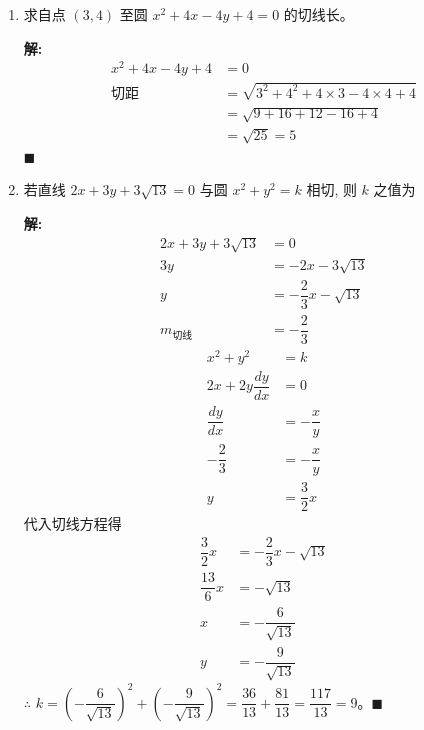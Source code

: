 \documentclass[10pt]{article}
\newcommand{\sol}{\textbf{解:} }
\begin{document}
\begin{enumerate}[leftmargin=*]
  \item 求自点 $(3,4)$ 至圆 $x^{2}+4 x-4 y+4=0$ 的切线长。

        \sol{}
        \begin{align*}
          x^{2}+4 x-4 y+4 & = 0                                              \\
          \text{切距}       & = \sqrt{3^2 + 4^2 + 4 \times 3 - 4 \times 4 + 4} \\
                          & = \sqrt{9 + 16 + 12 - 16 + 4}                    \\
                          & = \sqrt{25} = 5
        \end{align*} \hfill$\blacksquare$

  \item 若直线 $2 x+3 y+3 \sqrt{13}=0$ 与圆 $x^{2}+y^{2}=k$ 相切, 则 $k$ 之值为

        \sol{}
        \begin{align*}
          2x + 3y + 3\sqrt{13} & = 0                          \\
          3y                   & = -2x - 3\sqrt{13}           \\
          y                    & = -\dfrac{2}{3}x - \sqrt{13} \\
          m_{\text{切线}}        & = -\dfrac{2}{3}
        \end{align*}
        \begin{align*}
          x^{2}+y^{2}           & = k             \\
          2x + 2y\dfrac{dy}{dx} & = 0             \\
          \dfrac{dy}{dx}        & = -\dfrac{x}{y} \\
          -\dfrac{2}{3}         & = -\dfrac{x}{y} \\
          y                     & = \dfrac{3}{2}x
        \end{align*}
        代入切线方程得
        \begin{align*}
          \dfrac{3}{2}x  & = -\dfrac{2}{3}x - \sqrt{13} \\
          \dfrac{13}{6}x & = -\sqrt{13}                 \\
          x              & = -\dfrac{6}{\sqrt{13}}      \\
          y              & = -\dfrac{9}{\sqrt{13}}
        \end{align*}
        $\therefore$ $k = \left(-\dfrac{6}{\sqrt{13}}\right)^{2} + \left(-\dfrac{9}{\sqrt{13}}\right)^{2} = \dfrac{36}{13} + \dfrac{81}{13} = \dfrac{117}{13} = 9$。\hfill$\blacksquare$


\end{enumerate}
\end{document}
